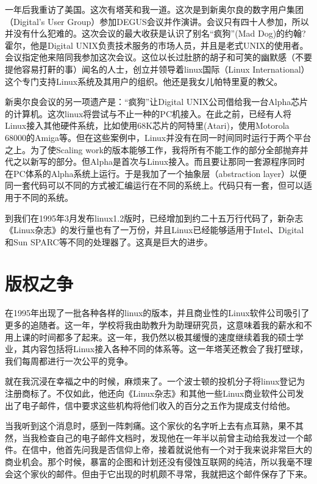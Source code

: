一年后我重访了美国。这次有塔芙和我一道。这次是到新奥尔良的数字用户集团（Digital’s User Group）参加DEGUS会议并作演讲。会议只有四十人参加，所以并没有什么犯难的。这次会议的最大收获是认识了别名“疯狗”(Mad Dog)的约翰?霍尔，他是Digital UNIX负责技术服务的市场人员，并且是老式UNIX的使用者。会议指定他来陪同我参加这次会议。这位以长过肚脐的胡子和可笑的幽默感（不要提他容易打鼾的事）闻名的人士，创立并领导着linux国际（Linux International）这个专门支持Linux系统及其用户的组织。他还是我女儿帕特里夏的教父。

新奥尔良会议的另一项遗产是：“疯狗”让Digital UNIX公司借给我一台Alpha芯片的计算机。这次linux将尝试与不止一种的PC机接入。在此之前，已经有人将Linux接入其他硬件系统，比如使用68K芯片的阿特里(Atari)，使用Motorola 68000的Amiga等。但在这些案例中，Linux并没有在同一时间同时运行于两个平台之上。为了使Scaling work的版本能够工作，我将所有不能工作的部分全部抛弃并代之以新写的部分。但Alpha是首次与Linux接入。而且要让那同一套源程序同时在PC体系的Alpha系统上运行。于是我加了一个抽象层（abstraction layer）以便同一套代码可以不同的方式被汇编运行在不同的系统上。代码只有一套，但可以适用于不同的系统。

到我们在1995年3月发布linux1.2版时，已经增加到约二十五万行代码了，新杂志《Linux杂志》的发行量也有了一万份，并且Linux已经能够适用于Intel、Digital和Sun SPARC等不同的处理器了。这真是巨大的进步。

 
\section{版权之争}

在1995年出现了一批各种各样的linux的版本，并且商业性的Linux软件公司吸引了更多的追随者。这一年，学校将我由助教升为助理研究员，这意味着我的薪水和不用上课的时间都多了起来。这一年，我仍然以极其缓慢的速度继续着我的硕士学业，其内容包括将Linux接入各种不同的体系等。这一年塔芙还教会了我打壁球，我们每周都进行一次公平的竞争。

就在我沉浸在幸福之中的时候，麻烦来了。一个波士顿的投机分子将linux登记为注册商标了。不仅如此，他还向《Linux杂志》和其他一些Linux商业软件公司发出了电子邮件，信中要求这些机构将他们收入的百分之五作为提成支付给他。

当我听到这个消息时，感到一阵刺痛。这个家伙的名字听上去有点耳熟，果不其然，当我检查自己的电子邮件文档时，发现他在一年半以前曾主动给我发过一个邮件。在信中，他首先问我是否信仰上帝，接着就说他有一个对于我来说非常巨大的商业机会。那个时候，暴富的企图和计划还没有侵蚀互联网的纯洁，所以我毫不理会这个家伙的邮件。但由于它出现的时机颇不寻常，我就把这个邮件保存了下来。

